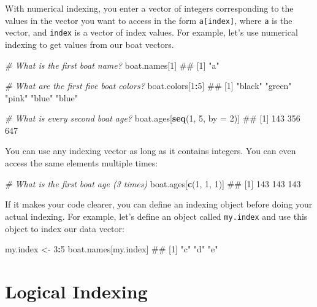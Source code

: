 \documentclass[]{book}
\newenvironment{Shaded}{\begin{snugshade}}{\end{snugshade}}
\newcommand{\KeywordTok}[1]{\textcolor[rgb]{0.13,0.29,0.53}{\textbf{#1}}}
\newcommand{\DataTypeTok}[1]{\textcolor[rgb]{0.13,0.29,0.53}{#1}}
\newcommand{\DecValTok}[1]{\textcolor[rgb]{0.00,0.00,0.81}{#1}}
\newcommand{\StringTok}[1]{\textcolor[rgb]{0.31,0.60,0.02}{#1}}
\newcommand{\CommentTok}[1]{\textcolor[rgb]{0.56,0.35,0.01}{\textit{#1}}}
\newcommand{\OperatorTok}[1]{\textcolor[rgb]{0.81,0.36,0.00}{\textbf{#1}}}
\newcommand{\NormalTok}[1]{#1}
\theoremstyle{definition}
\theoremstyle{definition}
\theoremstyle{remark}
\begin{document}
With numerical indexing, you enter a vector of integers corresponding to
the values in the vector you want to access in the form
\texttt{a{[}index{]}}, where \texttt{a} is the vector, and
\texttt{index} is a vector of index values. For example, let's use
numerical indexing to get values from our boat vectors.

\begin{Shaded}
\begin{Highlighting}[]
\CommentTok{# What is the first boat name?}
\NormalTok{boat.names[}\DecValTok{1}\NormalTok{]}
\NormalTok{## [1] "a"}

\CommentTok{# What are the first five boat colors?}
\NormalTok{boat.colors[}\DecValTok{1}\OperatorTok{:}\DecValTok{5}\NormalTok{]}
\NormalTok{## [1] "black" "green" "pink"  "blue"  "blue"}

\CommentTok{# What is every second boat age?}
\NormalTok{boat.ages[}\KeywordTok{seq}\NormalTok{(}\DecValTok{1}\NormalTok{, }\DecValTok{5}\NormalTok{, }\DataTypeTok{by =} \DecValTok{2}\NormalTok{)]}
\NormalTok{## [1] 143 356 647}
\end{Highlighting}
\end{Shaded}

You can use any indexing vector as long as it contains integers. You can
even access the same elements multiple times:

\begin{Shaded}
\begin{Highlighting}[]
\CommentTok{# What is the first boat age (3 times)}
\NormalTok{boat.ages[}\KeywordTok{c}\NormalTok{(}\DecValTok{1}\NormalTok{, }\DecValTok{1}\NormalTok{, }\DecValTok{1}\NormalTok{)]}
\NormalTok{## [1] 143 143 143}
\end{Highlighting}
\end{Shaded}

If it makes your code clearer, you can define an indexing object before
doing your actual indexing. For example, let's define an object called
\texttt{my.index} and use this object to index our data vector:

\begin{Shaded}
\begin{Highlighting}[]
\NormalTok{my.index <-}\StringTok{ }\DecValTok{3}\OperatorTok{:}\DecValTok{5}
\NormalTok{boat.names[my.index]}
\NormalTok{## [1] "c" "d" "e"}
\end{Highlighting}
\end{Shaded}

\section{Logical Indexing}\label{logical-indexing}
\end{document}
